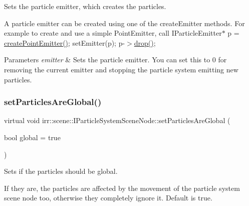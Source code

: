 Sets the particle emitter, which creates the particles. 

A particle emitter can be created using one of the create\+Emitter methods. For example to create and use a simple Point\+Emitter, call I\+Particle\+Emitter$\ast$ p = \hyperlink{classirr_1_1scene_1_1IParticleSystemSceneNode_a99e2549ad185f0c23b73f43869c60ab8}{create\+Point\+Emitter()}; set\+Emitter(p); p-\/$>$\hyperlink{classirr_1_1IReferenceCounted_a03856a09355b89d178090c4a5f738543}{drop()}; 
\begin{DoxyParams}{Parameters}
{\em emitter} & Sets the particle emitter. You can set this to 0 for removing the current emitter and stopping the particle system emitting new particles. \\
\hline
\end{DoxyParams}
\mbox{\label{classirr_1_1scene_1_1IParticleSystemSceneNode_adc1c12bd7bf1a075f00c5dafa3aff266}} 
\subsubsection{\texorpdfstring{set\+Particles\+Are\+Global()}{setParticlesAreGlobal()}\hspace{0.1cm}{\footnotesize\ttfamily [1/2]}}
{\footnotesize\ttfamily virtual void irr\+::scene\+::\+I\+Particle\+System\+Scene\+Node\+::set\+Particles\+Are\+Global (\begin{DoxyParamCaption}\item[{bool}]{global = {\ttfamily true} }\end{DoxyParamCaption})\hspace{0.3cm}{\ttfamily [pure virtual]}}



Sets if the particles should be global. 

If they are, the particles are affected by the movement of the particle system scene node too, otherwise they completely ignore it. Default is true. \mbox{\label{classirr_1_1scene_1_1IParticleSystemSceneNode_adc1c12bd7bf1a075f00c5dafa3aff266}} 
